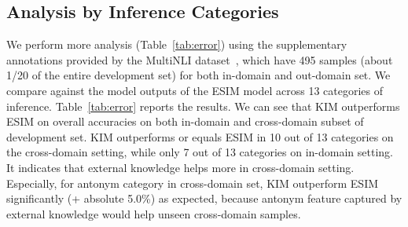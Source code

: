 \documentclass[11pt,a4paper]{article}
\begin{document}
\begin{table}[t!]
\renewcommand{\arraystretch}{0.9}
\centering
{}
\caption{The number of instances and accuracy per category achieved by ESIM and KIM on the~\citep{glockner_acl18} test set.}
\label{tab:category}
\end{table}

\subsection{Analysis by Inference Categories}

We perform more analysis (Table~\ref{tab:error}) using the supplementary annotations provided by the MultiNLI dataset~\citep{DBLP:journals/corr/WilliamsNB17}, which have 495 samples (about 1/20 of the entire development set) for both in-domain and out-domain set. We compare against the model outputs of the ESIM model across 13 categories of inference. Table~\ref{tab:error} reports the results. We can see that KIM outperforms ESIM on overall accuracies on both in-domain and cross-domain subset of development set. KIM outperforms or equals ESIM in 10 out of 13 categories on the cross-domain setting, while only 7 out of 13 categories on in-domain setting. It indicates that external knowledge helps more in cross-domain setting. Especially, for antonym category in cross-domain set, KIM outperform ESIM significantly (+ absolute 5.0\%) as expected, because antonym feature captured by external knowledge would help unseen cross-domain samples.
\end{document}
